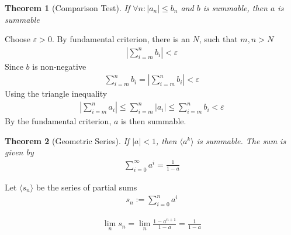 \documentclass{amsart}
\numberwithin{equation}{section}
\let\oldendproof\endproof
\renewenvironment{proof}[1][\proofname]{%
  \setcounter{case}{0}
  \setcounter{step}{0}
  \oldproof[#1]%
}{\oldendproof}
\theoremstyle{plain}
\newtheorem{theorem}{Theorem}[section]
\theoremstyle{definition}
\theoremstyle{remark}
\begin{document}
\begin{theorem}[Comparison Test]
  If $\forall n:|a_n| \leq b_n$	and $b$ is summable, then $a$ is summable
\end{theorem}
\begin{proof}
  Choose $\varepsilon>0$. By fundamental criterion, there is an $N$, such that $m, n> N$
  \begin{align}
    \left| \sum^n_{i=m} b_i\right| < \varepsilon
  \end{align}
  Since $b$ is non-negative
  \begin{align}
    \sum^n_{i=m} b_i = \left| \sum^n_{i=m} b_i\right| < \varepsilon
  \end{align}
  Using the triangle inequality
  \begin{align}
    \left| \sum_{i=m}^n a_i \right| \leq \sum^n_{i=m} |a_i| \leq \sum_{i=m}^n b_i < \varepsilon
  \end{align}
  By the fundamental criterion, $a$ is then summable.
\end{proof}

\begin{theorem}[Geometric Series]
  If $|a|<1$, then $\langle a^k \rangle$ is summable. The sum is given by
  \begin{align}
    \sum^\infty_{i=0} a^i = \frac{1}{1-a}
  \end{align}
\end{theorem}
\begin{proof}
  Let $\langle s_n \rangle$ be the series of partial sums
  \begin{align}
    s_n := \sum^n_{i=0} a^i
  \end{align}
  
  \begin{align}
    \lim_n s_n = \lim_n \frac{1-a^{n+1}}{1-a} = \frac{1}{1-a}
  \end{align}
\end{proof}
\end{document}
